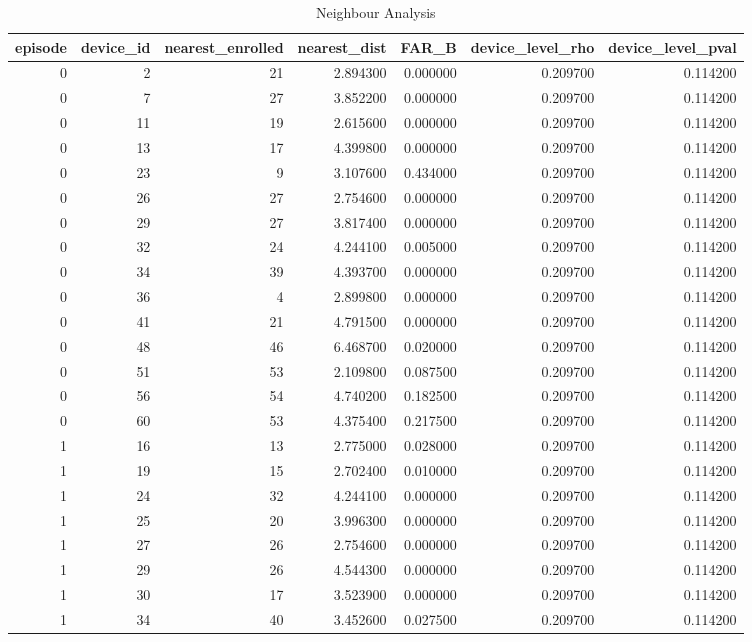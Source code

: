 \begin{table}
\caption{Neighbour Analysis}
\label{tab_neighbour_analysis}
\begin{tabular}{rrrrrrr}
\toprule
episode & device_id & nearest_enrolled & nearest_dist & FAR_B & device_level_rho & device_level_pval \\
\midrule
0 & 2 & 21 & 2.894300 & 0.000000 & 0.209700 & 0.114200 \\
0 & 7 & 27 & 3.852200 & 0.000000 & 0.209700 & 0.114200 \\
0 & 11 & 19 & 2.615600 & 0.000000 & 0.209700 & 0.114200 \\
0 & 13 & 17 & 4.399800 & 0.000000 & 0.209700 & 0.114200 \\
0 & 23 & 9 & 3.107600 & 0.434000 & 0.209700 & 0.114200 \\
0 & 26 & 27 & 2.754600 & 0.000000 & 0.209700 & 0.114200 \\
0 & 29 & 27 & 3.817400 & 0.000000 & 0.209700 & 0.114200 \\
0 & 32 & 24 & 4.244100 & 0.005000 & 0.209700 & 0.114200 \\
0 & 34 & 39 & 4.393700 & 0.000000 & 0.209700 & 0.114200 \\
0 & 36 & 4 & 2.899800 & 0.000000 & 0.209700 & 0.114200 \\
0 & 41 & 21 & 4.791500 & 0.000000 & 0.209700 & 0.114200 \\
0 & 48 & 46 & 6.468700 & 0.020000 & 0.209700 & 0.114200 \\
0 & 51 & 53 & 2.109800 & 0.087500 & 0.209700 & 0.114200 \\
0 & 56 & 54 & 4.740200 & 0.182500 & 0.209700 & 0.114200 \\
0 & 60 & 53 & 4.375400 & 0.217500 & 0.209700 & 0.114200 \\
1 & 16 & 13 & 2.775000 & 0.028000 & 0.209700 & 0.114200 \\
1 & 19 & 15 & 2.702400 & 0.010000 & 0.209700 & 0.114200 \\
1 & 24 & 32 & 4.244100 & 0.000000 & 0.209700 & 0.114200 \\
1 & 25 & 20 & 3.996300 & 0.000000 & 0.209700 & 0.114200 \\
1 & 27 & 26 & 2.754600 & 0.000000 & 0.209700 & 0.114200 \\
1 & 29 & 26 & 4.544300 & 0.000000 & 0.209700 & 0.114200 \\
1 & 30 & 17 & 3.523900 & 0.000000 & 0.209700 & 0.114200 \\
1 & 34 & 40 & 3.452600 & 0.027500 & 0.209700 & 0.114200 \\

\end{tabular}
\end{table}
